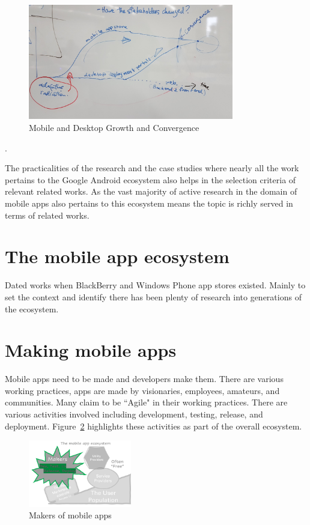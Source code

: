 \begin{figure}
    \centering
    \includegraphics[width=0.8\textwidth]{images/nii-shonan-workshop-152/shonan_hysteresis_diagram_20191210_132528.jpg}
    \caption{Mobile and Desktop Growth and Convergence}
    \label{fig:my_shonan_hysteresis_sketch}
\end{figure}
.


The practicalities of the research and the case studies where nearly all the work pertains to the Google Android ecosystem also helps in the selection criteria of relevant related works. As the vast majority of active research in the domain of mobile apps also pertains to this ecosystem means the topic is richly served in terms of related works.

\section{The mobile app ecosystem}

Dated works when BlackBerry and Windows Phone app stores existed. Mainly to set the context and identify there has been plenty of research into generations of the ecosystem.


\section{Making mobile apps}
Mobile apps need to be made and developers make them. There are various working practices, apps are made by visionaries, employees, amateurs, and communities. Many claim to be ``Agile" in their working practices. There are various activities involved including development, testing, release, and deployment. Figure~\ref{fig:my_mobile-app-makers} highlights these activities as part of the overall ecosystem.

\begin{figure}
    \centering
    \includegraphics[width=0.4\textwidth]{images/my/the-mobile-app-ecosystem-makers-dtrd.png}
    \caption{Makers of mobile apps}
    \label{fig:my_mobile-app-makers}
\end{figure}

